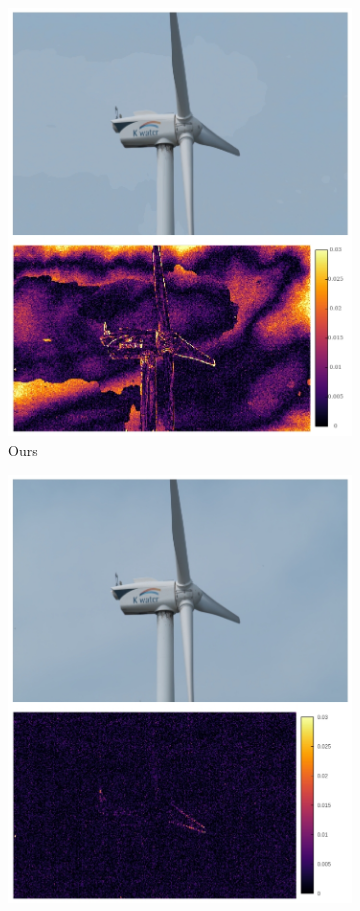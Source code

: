 \documentclass{article}
\begin{document}
\begin{figure}[h]
\begin{subfigure}{0.125\textwidth}
    \includegraphics[width=1\linewidth]{qua_imgs/TEST02_045_f0465_ours.jpg}
    \caption{Ours}
\end{subfigure}%
\begin{subfigure}{0.125\textwidth}
	\centering
    \includegraphics[width=1\linewidth]{qua_imgs/TEST02_045_f0465_abme.jpg}

\end{subfigure}
\end{figure}
\end{document}
